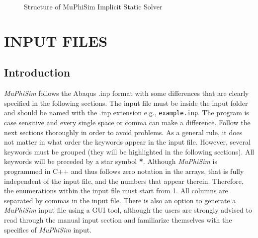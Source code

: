 \documentclass[oneside,11pt,times]{book}
\begin{document}
\begin{figure}[h!]
    \caption{Structure of MuPhiSim Implicit Static Solver}
    \label{fig:solverIS}
\end{figure}




\chapter{INPUT FILES}\label{Chapter:inputs}
\section{Introduction}
\textit{MuPhiSim} follows the Abaqus .inp format with some differences that are clearly specified in the following sections. The input file must be inside the input folder and should be named with the .inp extension e.g., \texttt{example.inp}. The program is case sensitive and every single space or comma can make a difference. Follow the next sections thoroughly in order to avoid problems. As a general rule, it does not matter in what order the keywords appear in the input file. However, several keywords must be grouped (they will be highlighted in the following sections). All keywords will be preceded by a star symbol \textbf{*}. Although \textit{MuPhiSim} is programmed in C++ and thus follows zero notation in the arrays, that is fully independent of the input file, and the numbers that appear therein. Therefore, the enumerations within the input file must start from 1. All columns are separated by commas in the input file. There is also an option to generate a \textit{MuPhiSim} input file using a GUI tool, although the users are strongly advised to read through the manual input section and familiarize themselves with the specifics of \textit{MuPhiSim} input.
\end{document}
